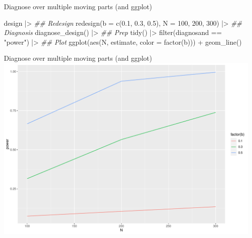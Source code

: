 \documentclass[
  11pt,
  ignorenonframetext,
]{beamer}
\newenvironment{Shaded}{\begin{snugshade}}{\end{snugshade}}
\newcommand{\AttributeTok}[1]{\textcolor[rgb]{0.40,0.45,0.13}{#1}}
\newcommand{\DecValTok}[1]{\textcolor[rgb]{0.68,0.00,0.00}{#1}}
\newcommand{\DocumentationTok}[1]{\textcolor[rgb]{0.37,0.37,0.37}{\textit{#1}}}
\newcommand{\FloatTok}[1]{\textcolor[rgb]{0.68,0.00,0.00}{#1}}
\newcommand{\FunctionTok}[1]{\textcolor[rgb]{0.28,0.35,0.67}{#1}}
\newcommand{\NormalTok}[1]{\textcolor[rgb]{0.00,0.23,0.31}{#1}}
\newcommand{\SpecialCharTok}[1]{\textcolor[rgb]{0.37,0.37,0.37}{#1}}
\newcommand{\StringTok}[1]{\textcolor[rgb]{0.13,0.47,0.30}{#1}}
\begin{document}
\begin{frame}[fragile]{Diagnose over multiple moving parts (and ggplot)}
\protect\hypertarget{diagnose-over-multiple-moving-parts-and-ggplot}{}
\begin{Shaded}
\begin{Highlighting}[]
\NormalTok{design }\SpecialCharTok{|\textgreater{}}
  \DocumentationTok{\#\# Redesign}
  \FunctionTok{redesign}\NormalTok{(}\AttributeTok{b =} \FunctionTok{c}\NormalTok{(}\FloatTok{0.1}\NormalTok{, }\FloatTok{0.3}\NormalTok{, }\FloatTok{0.5}\NormalTok{), }\AttributeTok{N =} \DecValTok{100}\NormalTok{, }\DecValTok{200}\NormalTok{, }\DecValTok{300}\NormalTok{) }\SpecialCharTok{|\textgreater{}}
  \DocumentationTok{\#\# Diagnosis}
  \FunctionTok{diagnose\_design}\NormalTok{() }\SpecialCharTok{|\textgreater{}}
  \DocumentationTok{\#\# Prep}
  \FunctionTok{tidy}\NormalTok{() }\SpecialCharTok{|\textgreater{}}
  \FunctionTok{filter}\NormalTok{(diagnosand }\SpecialCharTok{==} \StringTok{"power"}\NormalTok{) }\SpecialCharTok{|\textgreater{}}
  \DocumentationTok{\#\# Plot}
  \FunctionTok{ggplot}\NormalTok{(}\FunctionTok{aes}\NormalTok{(N, estimate, }\AttributeTok{color =} \FunctionTok{factor}\NormalTok{(b))) }\SpecialCharTok{+}
  \FunctionTok{geom\_line}\NormalTok{()}
\end{Highlighting}
\end{Shaded}
\end{frame}

\begin{frame}{Diagnose over multiple moving parts (and ggplot)}
\protect\hypertarget{diagnose-over-multiple-moving-parts-and-ggplot-1}{}
\includegraphics{0_lectures_files/figure-beamer/unnamed-chunk-453-1.pdf}
\end{frame}
\end{document}
